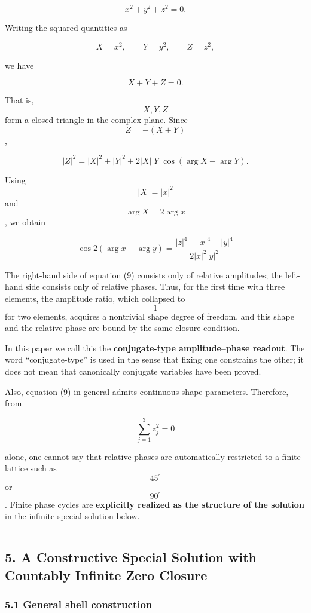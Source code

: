 \documentclass[
  a4paper,
]{article}
\begin{document}
\[
x^2+y^2+z^2=0.
\tag{7}
\]

Writing the squared quantities as

\[
X=x^2,
\qquad
Y=y^2,
\qquad
Z=z^2,
\]

we have

\[
X+Y+Z=0.
\tag{8}
\]

That is, \[X,Y,Z\] form a closed triangle in the complex plane. Since
\[Z=-(X+Y)\],

\[
|Z|^2
=
|X|^2+|Y|^2
+2|X||Y|\cos(\arg X-\arg Y).
\]

Using \[|X|=|x|^2\] and \[\arg X=2\arg x\], we obtain

\[
\boxed{
\cos 2(\arg x-\arg y)
=
\frac{|z|^4-|x|^4-|y|^4}
{2|x|^2|y|^2}
}
\tag{9}
\]

The right-hand side of equation (9) consists only of relative
amplitudes; the left-hand side consists only of relative phases. Thus,
for the first time with three elements, the amplitude ratio, which
collapsed to \[1\] for two elements, acquires a nontrivial shape degree
of freedom, and this shape and the relative phase are bound by the same
closure condition.

In this paper we call this the \textbf{conjugate-type amplitude--phase
readout}. The word ``conjugate-type'' is used in the sense that fixing
one constrains the other; it does not mean that canonically conjugate
variables have been proved.

Also, equation (9) in general admits continuous shape parameters.
Therefore, from

\[
\sum_{j=1}^{3}z_j^2=0
\]

alone, one cannot say that relative phases are automatically restricted
to a finite lattice such as \[45^\circ\] or \[90^\circ\]. Finite phase
cycles are \textbf{explicitly realized as the structure of the solution}
in the infinite special solution below.

\begin{center}\rule{0.5\linewidth}{0.5pt}\end{center}

\subsection{5. A Constructive Special Solution with Countably Infinite
Zero
Closure}\label{a-constructive-special-solution-with-countably-infinite-zero-closure}

\subsubsection{5.1 General shell
construction}\label{general-shell-construction}
\end{document}
